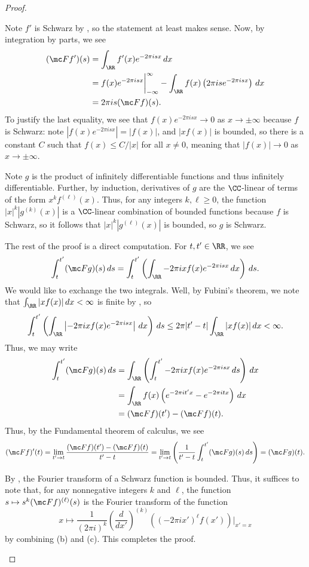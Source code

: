 \documentclass[notes.tex]{subfiles}
\begin{document}
\begin{proof}
\begin{listalph}
		\item Note $f'$ is Schwarz by , so the statement at least makes sense. Now, by integration by parts, we see
		\begin{align*}
			(\mc Ff')(s) &= \int_\RR f'(x)e^{-2\pi isx}\,dx \\
			&= f(x)e^{-2\pi isx}\bigg|_{-\infty}^{\infty}-\int_\RR f(x)\left(2\pi ise^{-2\pi isx}\right)\,dx \\
			&= 2\pi is(\mc Ff)(s).
		\end{align*}
		To justify the last equality, we see that $f(x)e^{-2\pi isx}\to0$ as $x\to\pm\infty$ because $f$ is Schwarz: note $\left|f(x)e^{-2\pi isx}\right|=|f(x)|$, and $|x f(x)|$ is bounded, so there is a constant $C$ such that $f(x)\le C/|x|$ for all $x\ne0$, meaning that $|f(x)|\to0$ as $x\to\pm\infty$.

		\item Note $g$ is the product of infinitely differentiable functions and thus infinitely differentiable. Further, by induction, derivatives of $g$ are the $\CC$-linear of terms of the form $x^kf^{(\ell)}(x)$. Thus, for any integers $k,\ell\ge0$, the function $|x|^k\left|g^{(k)}(x)\right|$ is a $\CC$-linear combination of bounded functions because $f$ is Schwarz, so it follows that $|x|^k\left|g^{(\ell)}(x)\right|$ is bounded, so $g$ is Schwarz.
		
		The rest of the proof is a direct computation. For $t,t'\in\RR$, we see
		\[\int_t^{t'}(\mc Fg)(s)\,ds=\int_t^{t'}\left(\int_\RR-2\pi ixf(x)e^{-2\pi isx}\,dx\right)\,ds.\]
		We would like to exchange the two integrals. Well, by Fubini's theorem, we note that $\int_\RR|xf(x)|\,dx<\infty$ is finite by , so
		\[\int_t^{t'}\left(\int_\RR\left|-2\pi ixf(x)e^{-2\pi isx}\right|\,dx\right)\,ds\le2\pi|t'-t|\int_\RR|xf(x)|\,dx<\infty.\]
		Thus, we may write
		\begin{align*}
			\int_t^{t'}(\mc Fg)(s)\,ds &= \int_\RR\left(\int_t^{t'}-2\pi ixf(x)e^{-2\pi isx}\,ds\right)\,dx \\
			&= \int_\RR f(x)\left(e^{-2\pi it'x}-e^{-2\pi itx}\right)\,dx \\
			&= (\mc Ff)(t')-(\mc Ff)(t).
		\end{align*}
		Thus, by the Fundamental theorem of calculus, we see
		\[(\mc Ff)'(t)=\lim_{t'\to t}\frac{(\mc Ff)(t')-(\mc Ff)(t)}{t'-t}=\lim_{t'\to t}\left(\frac1{t'-t}\int_t^{t'}(\mc Fg)(s)\,ds\right)=(\mc Fg)(t).\]

		\item By , the Fourier transform of a Schwarz function is bounded. Thus, it suffices to note that, for any nonnegative integers $k$ and $\ell$, the function $s\mapsto s^k(\mc Ff)^{(\ell)}(s)$ is the Fourier transform of the function
		\[x\mapsto\frac1{(2\pi i)^k}\left(\frac d{dx'}\right)^{(k)}\left((-2\pi ix')^\ell f(x')\right)\bigg|_{x'=x}\]
		by combining (b) and (c). This completes the proof.
		\qedhere
	\end{listalph}
\end{proof}
\end{document}
